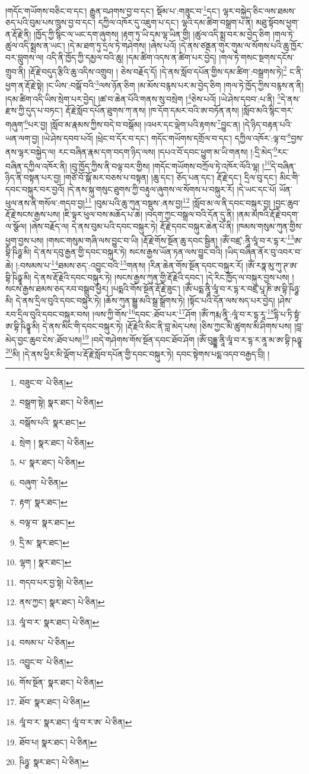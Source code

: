 །གདོང་གཡོགས་བཅིང་བ་དང་། རྒྱུན་བཤགས་བྱ་བ་དང་། སྡོམ་པ་:གཟུང་བ་\footnote{བཟུང་བ་  པེ་ཅིན། }དང་། ལྷར་བསྐྱེད་ཅིང་ལས་ཐམས་ཅད་པའི་བུམ་པས་ཁྲུས་བྱ་བ་དང་། དཀྱིལ་འཁོར་དུ་འཇུག་པ་དང་། ལྷའི་དམ་ཚིག་བསྒྲག་པ་ནི། མཐུ་སྟོབས་ཕྱག་ན་རྡོ་རྗེ་ནི། །ཁྱོད་ཀྱི་སྙིང་ལ་ཡང་དག་ཞུགས། །རྟག་ཏུ་ཡི་དམ་ལྷ་ཡིན་གྱི། །ཚུལ་འདི་སྨྲ་བར་མ་བྱེད་ཅིག །གལ་ཏེ་ཚུལ་འདི་སྨྲས་ན་ཡང་། །དེ་མ་ཐག་ཏུ་དྲལ་ཏེ་གཤེགས། །ཞེས་པའོ། །དེ་ནས་ཙནྡན་གུར་གུམ་ལ་སོགས་པའི་ཆུ་ཁྱོར་བར་བླུགས་ལ། འདི་ནི་ཁྱོད་ཀྱི་དམྱལ་བའི་ཆུ། །དམ་ཚིག་འདས་ན་ཚིག་པར་བྱེད། །གལ་ཏེ་གསང་སྔགས་དངོས་གྲུབ་ནི། །རྡོ་རྗེ་བདུད་རྩིའི་ཆུ་འདིས་འགྲུབ། །
ཅེས་བརྗོད་དོ། །དེ་ནས་སློབ་དཔོན་གྱིས་དམ་ཚིག་:བསྒྲགས་ཏེ།\footnote{བསྒྲག་སྟེ།  སྣར་ཐང་།  པེ་ཅིན། } ང་ནི་ཕྱག་ན་རྡོ་རྗེ་སྟེ། །ང་ཡིས་:བསྒོ་བའི་\footnote{བསྒོས་པའི་  སྣར་ཐང་། }ལས་ཉོན་ཅིག །མ་མོས་བརྙས་པར་མ་བྱེད་ཅིག །གལ་ཏེ་ཁྱོད་ཀྱིས་བརྙས་ན་ནི། །དམ་ཚིག་འདི་ཡིས་སྲེག་པར་བྱེད། །ཚ་བ་ཆེན་པོའི་གནས་སུ་བསྲེག །\footnote{སྲེག །  སྣར་ཐང་།  པེ་ཅིན། }ཅེས་པའོ། །ཡེ་ཤེས་དབབ་:པ་ནི། \footnote{པ་  སྣར་ཐང་།  པེ་ཅིན། }དེ་ནས་རྫས་ཀྱི་དུད་པ་བཏང་། རྡོ་རྗེ་སློབ་དཔོན་ཐུགས་ཀ་ནས། །ཁ་དོག་དམར་བའི་ཨ་བཏོན་ནས། །སློབ་མའི་སྙིང་གར་གཞུག་\footnote{བཞུག་  པེ་ཅིན། }པར་བྱ། །སློབ་མ་རྣམས་ཀྱིས་བདེ་བ་བསྒོམ། །འཕར་དང་ལྡེག་པའི་རྟགས་\footnote{རྟག་  སྣར་ཐང་། }བྱུང་ན། །དེ་ཉིད་བརྟན་པའི་ཡན་ལག་བྱ། །ཡེ་ཤེས་དབབ་པའོ། །ཕྲེང་བ་དོར་བ་དང་། གདོང་གཡོགས་དགྲོལ་བ་དང་། དཀྱིལ་འཁོར་:ལྟ་བ་\footnote{བལྟ་བ་  སྣར་ཐང་། }བྱས་ནས་ལྷར་བསྐྱེད་ལ། རང་བཞིན་རྣམ་དག་བདག་ཉིད་ལས། །དཔའ་བོ་དབང་ཕྱུག་མ་ཡི་གནས། །:དྲི་མེད་\footnote{དྲི་མ་  སྣར་ཐང་། }རང་བཞིན་དཀྱིལ་འཁོར་ནི། །བུ་ཁྱོད་ཀྱིས་ནི་བལྟ་བར་གྱིས། །གདོང་གཡོགས་བཀྲོལ་ཏེ་འཁོར་ལོའི་ལྷ། །\footnote{ལྷག །  སྣར་ཐང་། }དེ་བཞིན་ཉིད་ནི་བསྟན་པར་བྱ། །གཙོ་བོ་སྒོ་མར་བཅས་པ་བསྟན། །ཆུ་དང་། ཅོད་པན་དང་། རྡོ་རྗེ་དང་། དྲིལ་བུ་དང་། མིང་གི་དབང་བསྐུར་བར་བྱའོ། །དེ་ནས་སྐུ་གསུང་ཐུགས་ཀྱི་བརྟུལ་ཞུགས་ལ་སོགས་པ་བསྐུར་རོ། །དེ་ཡང་དང་པོ། ཡོན་ཕུལ་ནས་ནི་གསོལ་:གདབ་བྱ།\footnote{གདབ་པར་བྱ་སྟེ།  པེ་ཅིན། } །བུམ་པའི་ཆུ་ཀུན་བསྡུས་:ནས་བྱ།\footnote{ནས་ཀྱང་།  སྣར་ཐང་།  པེ་ཅིན། } །སློབ་མ་ལ་ནི་དབང་བསྐུར་བྱ། །བྱང་ཆུབ་རྡོ་རྗེ་སངས་རྒྱས་པས། །ཇི་ལྟར་ཕུལ་བས་མཆོད་པ་ཆེ། །བདག་ཀྱང་བསྒྲལ་བའི་དོན་དུ་ནི། །ནམ་མཁའི་རྡོ་རྗེ་བདག་ལ་སྩོལ། །ཞེས་བརྗོད་ལ། དེ་ནས་བུམ་པའི་དབང་བསྐུར་ཏེ། རྡོ་རྗེ་དབང་བསྐུར་ཆེན་པོ་ནི། །ཁམས་གསུམ་ཀུན་གྱིས་ཕྱག་བྱས་པས། །གསང་གསུམ་གཞི་ལས་བྱུང་བ་ཡི། །རྡོ་རྗེ་གོས་སྔོན་ཆུ་དབང་སྦྱིན། །ཨོཾ་བཛྲ་:ནཱི་ལཱཾ་བ་ར་དྷ་ར་\footnote{ལཱཾ་བ་ར་  སྣར་ཐང་།  པེ་ཅིན། }ཨ་བྷི་ཥིཉྩ་མི། དེ་ནས་དབུ་རྒྱན་གྱི་དབང་བསྐུར་ཏེ། སངས་རྒྱས་ཡོན་ཏན་ལས་བྱུང་བའི། །ཡིད་བཞིན་ནོར་བུ་འབར་བ་ཆེ། །:བསམས་པ་\footnote{བསམ་པ་  པེ་ཅིན། }ཐམས་ཅད་:འབྱུང་བའི་\footnote{འབྱུང་བ་  པེ་ཅིན། }གནས། །རིན་ཆེན་གོས་སྔོན་དབང་བསྐུར་རོ། །ཨོཾ་རཏྣ་མུ་ཀུ་ཊ་ཨ་བྷི་ཥིཉྩཱ་མི། དེ་ནས་རྡོ་རྗེའི་དབང་བསྐུར་ཏེ། །སངས་རྒྱས་ཀུན་གྱི་རྡོ་རྗེའི་དབང་། །དེ་རིང་ཁྱོད་ལ་བསྐུར་བྱས་པས། །སངས་རྒྱས་ཐམས་ཅད་རབ་བསྒྲུབ་ཕྱིར། །པདྨའི་གོས་སྔོན་རྡོ་རྗེ་ཟུང་། །ཨོཾ་པདྨ་ནཱི་ལཱཾ་བ་ར་དྷ་ར་བཛྲ་པཱ་ཎི་ཨ་བྷི་ཥིཉྩ་མི། དེ་ནས་དྲིལ་བུའི་དབང་བསྐུར་ཏེ། །ཆོས་ཀུན་སྒྱུ་མའི་སྒྲ་སྒྲོགས་ཏེ། །སྟོང་པའི་དོན་ལས་སད་པར་བྱེད། །ཤེས་རབ་དྲིལ་བུའི་དབང་བསྐུར་བས། །ལས་ཀྱི་གོས་\footnote{གོས་སྔོན་  སྣར་ཐང་།  པེ་ཅིན། }དབང་:ཐོབ་པར་\footnote{ཐོབ་  སྣར་ཐང་།  པེ་ཅིན། }ཤོག །ཨོཾ་ཀརྨ་ནཱི་:ལཱཾ་བ་ར་དྷ་རཱ་\footnote{ལཱཾ་བ་ར་  སྣར་ཐང་། ལཱཾ་བ་ར་ཨ་  པེ་ཅིན། }དྷི་པ་ཏི་སྟྭཾ་ཨ་བྷི་ཥིཉྩཱ་མི། དེ་ནས་མིང་གི་དབང་བསྐུར་ཏེ། །རྡོ་རྗེའི་མིང་ནི་བླ་མེད་པས། །ཅིས་ཀྱང་མི་ཚུགས་མི་ཤིགས་པས། །བླ་མེད་བྱང་ཆུབ་ངེས་:ཐོབ་པས།\footnote{ཐོབ་པ།  སྣར་ཐང་།  པེ་ཅིན། } །བདེ་གཤེགས་གོས་སྔོན་དབང་ཐོབ་ཤོག །ཨོཾ་བུདྡྷ་ནཱི་ལཱཾ་བ་ར་དྷ་ར་ནཱ་མ་ཨ་བྷི་ཥཉྩཱ་\footnote{ཥིཉྩ་  སྣར་ཐང་།  པེ་ཅིན། }མི། །དེ་ནས་ཕྱིར་མི་ལྡོག་པ་རྡོ་རྗེ་སློབ་དཔོན་གྱི་དབང་བསྐུར་ཏེ། དབང་སྟེགས་པདྨ་འདབ་བརྒྱད་བྲི། །

